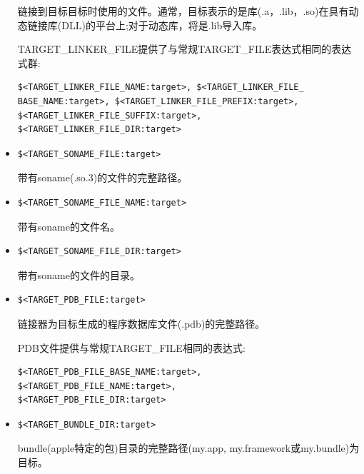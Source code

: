 \begin{itemize}
链接到目标目标时使用的文件。通常，目标表示的是库(.a，.lib，.so)在具有动态链接库(DLL)的平台上;对于动态库，将是.lib导入库。

TARGET\_LINKER\_FILE提供了与常规TARGET\_FILE表达式相同的表达式群:

\begin{lstlisting}[style=styleCMake]
$<TARGET_LINKER_FILE_NAME:target>, $<TARGET_LINKER_FILE_
BASE_NAME:target>, $<TARGET_LINKER_FILE_PREFIX:target>,
$<TARGET_LINKER_FILE_SUFFIX:target>,
$<TARGET_LINKER_FILE_DIR:target>
\end{lstlisting}

\item 
\begin{lstlisting}[style=styleCMake]
$<TARGET_SONAME_FILE:target>
\end{lstlisting}

带有soname(.so.3)的文件的完整路径。

\item 
\begin{lstlisting}[style=styleCMake]
$<TARGET_SONAME_FILE_NAME:target>
\end{lstlisting}

带有soname的文件名。

\item 
\begin{lstlisting}[style=styleCMake]
$<TARGET_SONAME_FILE_DIR:target> 
\end{lstlisting}

带有soname的文件的目录。

\item 
\begin{lstlisting}[style=styleCMake]
$<TARGET_PDB_FILE:target>
\end{lstlisting}

链接器为目标生成的程序数据库文件(.pdb)的完整路径。

PDB文件提供与常规TARGET\_FILE相同的表达式:

\begin{lstlisting}[style=styleCMake]
$<TARGET_PDB_FILE_BASE_NAME:target>, $<TARGET_PDB_FILE_NAME:target>,
$<TARGET_PDB_FILE_DIR:target>
\end{lstlisting}

\item 
\begin{lstlisting}[style=styleCMake]
$<TARGET_BUNDLE_DIR:target> 
\end{lstlisting}

bundle(apple特定的包)目录的完整路径(my.app, my.framework或my.bundle)为目标。


\end{itemize}
